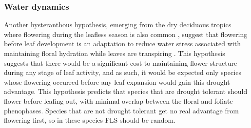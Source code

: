 \documentclass[12pt]{article}\usepackage[]{graphicx}\usepackage[]{color}
\begin{document}
\subsubsection*{Water dynamics}
\indent\indent Another hysteranthous hypothesis, emerging from the dry deciduous tropics where flowering during the leafless season is also common \citep{Janzen1967}, suggest that flowering before leaf development is an adaptation to reduce water stress associated with maintaining floral hydration while leaves are transpiring \citep{Franklin2016}. %
This hypothesis suggests that there would be a significant cost to maintaining flower structure during any stage of leaf activity, and as such, it would be expected only species whose flowering occurred before any leaf expansion would gain this drought advantage. This hypothesis predicts that species that are drought tolerant should flower before leafing out, with minimal overlap between the floral and foliate phenophases. Species that are not drought tolerant get no real advantage from flowering first, so in these species FLS should be random. %
\end{document}
